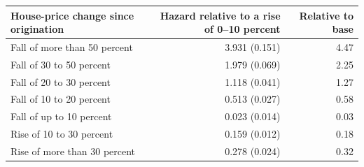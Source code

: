 \begin{tabular}{lrr}
\toprule
House-price change since origination & Hazard relative to a rise of 0--10 percent & Relative to base \\
\midrule
Fall of more than 50 percent & 3.931 (0.151) & 4.47 \\
Fall of 30 to 50 percent & 1.979 (0.069) & 2.25 \\
Fall of 20 to 30 percent & 1.118 (0.041) & 1.27 \\
Fall of 10 to 20 percent & 0.513 (0.027) & 0.58 \\
Fall of up to 10 percent & 0.023 (0.014) & 0.03 \\
Rise of 10 to 30 percent & 0.159 (0.012) & 0.18 \\
Rise of more than 30 percent & 0.278 (0.024) & 0.32 \\
\bottomrule
\end{tabular}

